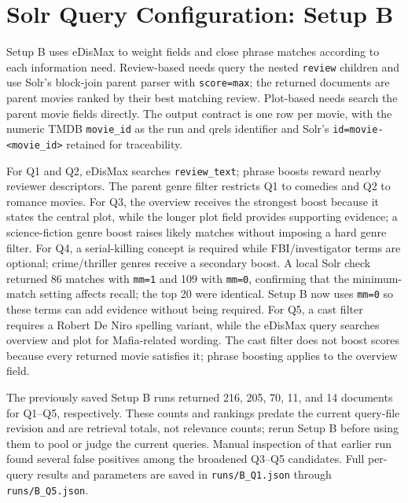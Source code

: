 
\section{Solr Query Configuration: Setup B}

Setup B uses eDisMax to weight fields and close phrase matches according to each
information need. Review-based needs query the nested \texttt{review} children and
use Solr's block-join parent parser with \texttt{score=max}; the returned documents
are parent movies ranked by their best matching review. Plot-based needs search the
parent movie fields directly. The output contract is one row per movie, with the
numeric TMDB \texttt{movie\_id} as the run and qrels identifier and Solr's
\texttt{id=movie-<movie\_id>} retained for traceability.

For Q1 and Q2, eDisMax searches \texttt{review\_text}; phrase boosts reward nearby
reviewer descriptors. The parent genre filter restricts Q1 to comedies and Q2 to
romance movies. For Q3, the overview receives the strongest boost because it states
the central plot, while the longer plot field provides supporting evidence; a
science-fiction genre boost raises likely matches without imposing a hard genre
filter. For Q4, a serial-killing concept is required while FBI/investigator terms
are optional; crime/thriller genres receive a secondary boost. A local Solr check
returned 86 matches with \texttt{mm=1} and 109 with \texttt{mm=0}, confirming that
the minimum-match setting affects recall; the top 20 were identical. Setup B now
uses \texttt{mm=0} so these terms can add evidence without being required. For Q5,
a cast filter requires a Robert De Niro spelling variant, while
the eDisMax query searches overview and plot for Mafia-related wording. The cast
filter does not boost scores because every returned movie satisfies it; phrase
boosting applies to the overview field.

The previously saved Setup B runs returned 216, 205, 70, 11, and 14 documents for
Q1--Q5, respectively. These counts and rankings predate the current query-file
revision and are retrieval totals, not relevance counts; rerun Setup B before
using them to pool or judge the current queries. Manual inspection of that earlier
run found several false positives among the broadened Q3--Q5 candidates. Full per-query results and parameters are saved in
\texttt{runs/B\_Q1.json} through \texttt{runs/B\_Q5.json}.

